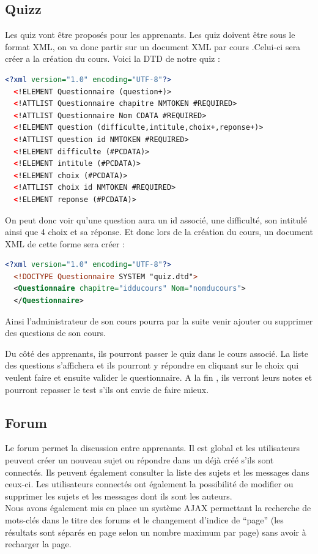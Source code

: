\documentclass[a4paper,11pt]{article}
\begin{document}
\subsection{Quizz}
Les quiz vont être proposés pour les apprenants. Les quiz doivent être sous le format XML, on va donc partir sur un document XML par cours .Celui-ci sera créer a la création du cours.
Voici la DTD de notre quiz : 
\begin{lstlisting}[language=XML]
  <?xml version="1.0" encoding="UTF-8"?>
  <!ELEMENT Questionnaire (question+)>
  <!ATTLIST Questionnaire chapitre NMTOKEN #REQUIRED>
  <!ATTLIST Questionnaire Nom CDATA #REQUIRED>
  <!ELEMENT question (difficulte,intitule,choix+,reponse+)>
  <!ATTLIST question id NMTOKEN #REQUIRED>
  <!ELEMENT difficulte (#PCDATA)>
  <!ELEMENT intitule (#PCDATA)>
  <!ELEMENT choix (#PCDATA)>
  <!ATTLIST choix id NMTOKEN #REQUIRED>
  <!ELEMENT reponse (#PCDATA)>
\end{lstlisting}
On peut donc voir qu'une question aura un id associé, une difficulté, son intitulé ainsi que 4 choix et sa réponse.
Et donc lors de la création du cours, un document XML de cette forme sera créer : 
\begin{lstlisting}[language=XML]
  <?xml version="1.0" encoding="UTF-8"?>
  <!DOCTYPE Questionnaire SYSTEM "quiz.dtd">
  <Questionnaire chapitre="idducours" Nom="nomducours"> 
  </Questionnaire>
\end{lstlisting} 

Ainsi l'administrateur de son cours pourra par la suite venir ajouter ou supprimer des questions de son cours. 

Du côté des apprenants, ils pourront passer le quiz dans le cours associé. La liste des questions s'affichera et ils pourront y répondre en cliquant sur le choix qui veulent faire et ensuite valider le questionnaire.
A la fin , ils verront leurs notes et pourront repasser le test s'ils ont envie de faire mieux.
\subsection{Forum}
Le forum permet la discussion entre apprenants. Il est global et les utilisateurs peuvent créer un nouveau sujet ou répondre dans un déjà créé s'ils sont connectés. Ils peuvent également consulter la liste des sujets et les messages dans ceux-ci. Les utilisateurs connectés ont également la possibilité de modifier ou supprimer les sujets et les messages dont ils sont les auteurs.\\
Nous avons également mis en place un système AJAX permettant la recherche de mots-clés dans le titre des forums et le changement d'indice de ``page'' (les résultats sont séparés en page selon un nombre maximum par page) sans avoir à recharger la page.
\end{document}
